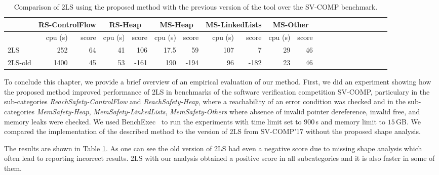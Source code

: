 {%
\begin{table}[t]
\captionsetup{font=small}
\caption{Comparison of 2LS using the proposed method with the previous version of the tool over the SV-COMP benchmark.}
\vspace*{-1mm}
\label{tab:2ls-old}
\centering
\scriptsize
\bgroup
\def\arraystretch{1.2}
\begin{tabular}{|l| r | r | r | r | r | r | r | r | r | r | r | r | r | r | r | r | r | r | r | r |}
\hline
& \multicolumn{2}{c|}{\textbf{RS-ControlFlow}}  & \multicolumn{2}{c|}{\textbf{RS-Heap}} & \multicolumn{2}{c|}{\textbf{MS-Heap}} & \multicolumn{2}{c|}{\textbf{MS-LinkedLists}} & \multicolumn{2}{c|}{\textbf{MS-Other}}\\\hline
        & cpu (s) & score & cpu (s) & score & cpu (s) & score & cpu (s) & score & cpu (s) & score \\\hline
 2LS     & 252  & 64 & 41    & 106  & 17.5 & 59   & 107  & 7    & 29 & 46\\\hline
2LS-old & 1400 & 45 & 53  & -161 & 190 & -194 & 96 & -182 & 23 & 46\\\hline
\end{tabular}
\egroup
\end{table}

To conclude this chapter, we provide a brief overview of an empirical evaluation of our method.
First, we did an experiment showing how the proposed method improved performance of 2LS
in benchmarks of the software verification competition SV-COMP,
particulary in the sub-categories \emph{ReachSafety-ControlFlow} and \emph{ReachSafety-Heap},
where a reachability of an error condition was checked and in the sub-categories
\emph{MemSafety-Heap}, \emph{MemSafety-LinkedLists}, \emph{MemSafety-Others}
where absence of invalid pointer dereference,
invalid free, and memory leaks were checked.
We used BenchExec~\cite{BLW15} to run the experiments with
time limit set to $900$\,s and memory limit to $15$\,GB.
We compared the implementation of the described method to the version of 2LS from SV-COMP'17 without
the proposed shape analysis.

The results are shown in Table \ref{tab:2ls-old}.
As one can see the old version of 2LS had even a negative score due to
missing shape analysis which often lead to reporting incorrect results.
2LS with our analysis obtained a positive score in all subcategories and it is
also faster in some of them.

}
